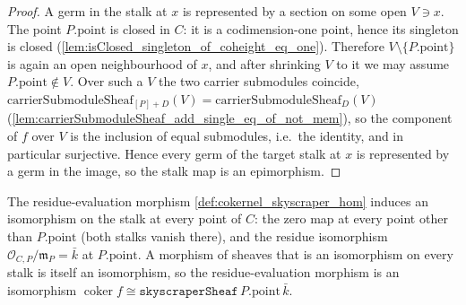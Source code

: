 \begin{proof}
  A germ in the stalk at \(x\) is represented by a section on some open
  \(V \ni x\). The point \(P.\mathrm{point}\) is closed in \(C\): it is a
  codimension-one point, hence its singleton is closed
  (\cref{lem:isClosed_singleton_of_coheight_eq_one}). Therefore
  \(V \setminus \{P.\mathrm{point}\}\) is again an open neighbourhood of \(x\),
  and after shrinking \(V\) to it we may assume \(P.\mathrm{point} \notin V\).
  Over such a \(V\) the two carrier submodules coincide,
  \(\mathrm{carrierSubmoduleSheaf}_{[P]+D}(V) =
  \mathrm{carrierSubmoduleSheaf}_D(V)\)
  (\cref{lem:carrierSubmoduleSheaf_add_single_eq_of_not_mem}), so the component
  of \(f\) over \(V\) is the inclusion of equal submodules, i.e.\ the identity,
  and in particular surjective. Hence every germ of the target stalk at \(x\)
  is represented by a germ in the image, so the stalk map is an epimorphism.
\end{proof}

\begin{lemma}
  \label{lem:cokernel_skyscraper_hom_isIso}
  The residue-evaluation morphism \cref{def:cokernel_skyscraper_hom} induces an
  isomorphism on the stalk at every point of \(C\): the zero map at every point
  other than \(P.\mathrm{point}\) (both stalks vanish there), and the residue
  isomorphism \(\mathcal O_{C,P}/\mathfrak m_P = \bar k\) at
  \(P.\mathrm{point}\). A morphism of sheaves that is an isomorphism on every
  stalk is itself an isomorphism, so the residue-evaluation morphism is an
  isomorphism
  \(\operatorname{coker} f \cong
  \texttt{skyscraperSheaf}\,P.\mathrm{point}\,\bar k\).
\end{lemma}

